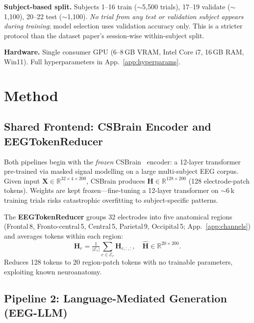 \documentclass{article}
\begin{document}
\textbf{Subject-based split.} Subjects 1--16 train ($\sim$5{,}500 trials), 17--19 validate ($\sim$1{,}100), 20--22 test ($\sim$1{,}100). \emph{No trial from any test or validation subject appears during training}; model selection uses validation accuracy only. This is a stricter protocol than the dataset paper's session-wise within-subject split.

\textbf{Hardware.} Single consumer GPU (6--8\,GB VRAM, Intel Core i7, 16\,GB RAM, Win11). Full hyperparameters in App.~\ref{app:hyperparams}.

\section{Method}

\subsection{Shared Frontend: CSBrain Encoder and EEGTokenReducer}

Both pipelines begin with the \emph{frozen} CSBrain~\citep{zhu2024csbrain} encoder: a 12-layer transformer pre-trained via masked signal modelling on a large multi-subject EEG corpus. Given input $\mathbf{X}\in\mathbb{R}^{32\times4\times200}$, CSBrain produces $\mathbf{H}\in\mathbb{R}^{128\times200}$ (128 electrode-patch tokens). Weights are kept frozen---fine-tuning a 12-layer transformer on $\sim$6\,k training trials risks catastrophic overfitting to subject-specific patterns.

The \textbf{EEGTokenReducer} groups 32 electrodes into five anatomical regions (Frontal\,8, Fronto-central\,5, Central\,5, Parietal\,9, Occipital\,5; App.~\ref{app:channels}) and averages tokens within each region:
\begin{equation}
  \hat{\mathbf{H}}_r = \tfrac{1}{|\mathcal{E}_r|} \textstyle\sum_{c\in\mathcal{E}_r} \mathbf{H}_{c,:,:},
  \quad \hat{\mathbf{H}}\in\mathbb{R}^{20\times 200}.
\end{equation}
Reduces 128 tokens to 20 region-patch tokens with no trainable parameters, exploiting known neuroanatomy.

\subsection{Pipeline 2: Language-Mediated Generation (EEG-LLM)}
\end{document}
